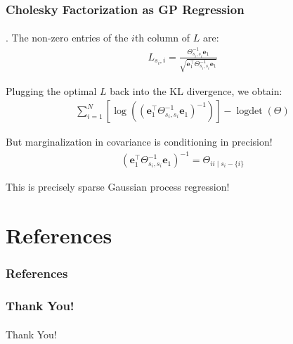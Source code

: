 \documentclass{beamer}                             %
\renewcommand{\vec}[1]{\bm{#1}}
\DeclareMathOperator{\logdet}{logdet}
\begin{document}
\begin{frame}
\frametitle{Cholesky Factorization as GP Regression}
\framesubtitle{}
\begin{theorem}
  \cite{schafer2020sparse}.
  The non-zero entries of the \( i \)th
  column of \( L \) are:
  \begin{align*}
    L_{s_i, i} = \frac{\Theta_{s_i, s_i}^{-1} \vec{e}_1}
    {\sqrt{\vec{e}_1^{\top} \Theta_{s_i, s_i}^{-1} \vec{e}_1}}
  \end{align*}
\end{theorem}

\pause

Plugging the optimal \( L \) back
into the KL divergence, we obtain:
\begin{align*}
  \sum_{i = 1}^N
    \left [
      \log \left (
        (\vec{e}_1^{\top} \Theta_{s_i, s_i}^{-1} \vec{e}_1)^{-1}
      \right )
    \right ]
    - \logdet(\Theta)
\end{align*}

\pause

But marginalization in covariance is conditioning in precision!
\begin{align*}
  (\vec{e}_1^{\top} \Theta_{s_i, s_i}^{-1} \vec{e}_1)^{-1} =
  \Theta_{ii \mid s_i - \{ i \}}
\end{align*}

\pause

This is precisely sparse Gaussian process regression!

\end{frame}

\section{References}

\begin{frame}
\frametitle{References}
\framesubtitle{}
\printbibliography
\end{frame}

\begin{frame}
\frametitle{Thank You!}
\framesubtitle{}

\centering
{\Huge Thank You!}
\end{frame}
\end{document}
